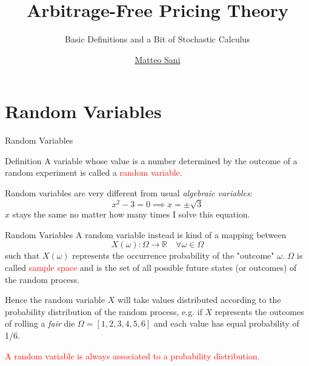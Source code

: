 \documentclass{beamer}
\title{Arbitrage-Free Pricing Theory}
\subtitle{Basic Definitions and a Bit of Stochastic Calculus}
\author{\href{mailto:matteo.sani@unisi.it}{Matteo Sani}}
\begin{document}
	\begin{frame}[plain]
		\maketitle
	\end{frame}


\section{Random Variables}
\begin{frame}{Random Variables}
	\begin{block}{Definition}
	A variable whose value is a number determined by the outcome of a random experiment is called a \textcolor{red}{random variable}.
	\end{block}
	\vspace{0.5 cm}
        
	\pause
	Random variables are very different from usual \emph{algebraic variables}:
\begin{equation*}
	x^2 - 3 = 0 \implies x = \pm \sqrt{3}
\end{equation*}	
	$x$ stays the same no matter how many times I solve this equation.
\end{frame}

\begin{frame}{Random Variables}
	A random variable instead is kind of a mapping between 
	\begin{equation*}
		X(\omega):\Omega\rightarrow \mathbb{R}\quad \forall\omega\in\Omega
	\end{equation*}
	such that $X(\omega)$ represents the occurrence probability of the "outcome" $\omega$. $\Omega$ is called \textcolor{red}{sample space} and is the set of all possible future states (or outcomes) of the random process.
	\pause
	\vspace{0.5cm}
        
	Hence the random variable $X$ will take values distributed according to the probability distribution of the random process, e.g. if $X$ represents the outcomes of rolling a \emph{fair} die $\Omega = [1,2,3,4,5,6]$ and each value has equal probability of 1/6.
	\vspace{0.5cm}
        
	\textcolor{red}{A random variable is always associated to a probability distribution.}
\end{frame}
\end{document}
